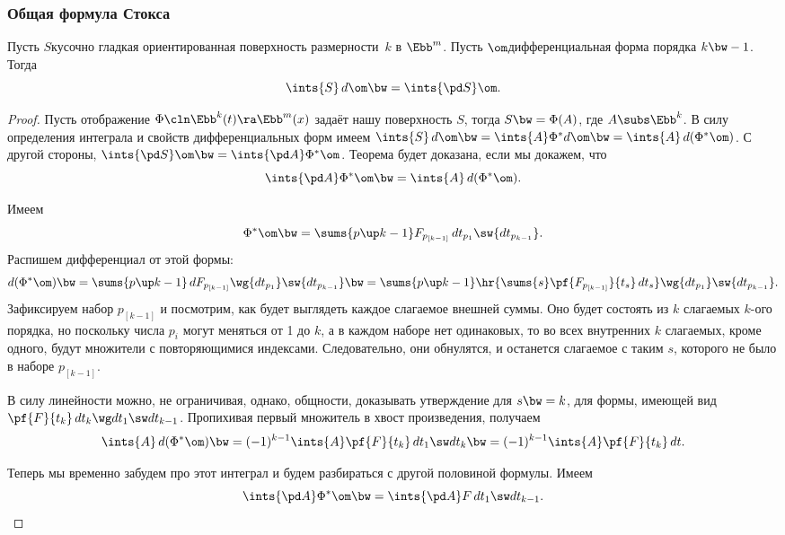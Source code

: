 \documentclass[a4paper]{article}
\newcommand{\pv}[1]{{p_{[#1]}}}
\newcommand{\di}[3]{{d {#1}_{#2_{#3}}}}
\begin{document}
\subsubsection{Общая формула Стокса}

\begin{theorem}
Пусть $S$\т кусочно гладкая ориентированная поверхность размерности~$k$ в $\Ebb^m$. Пусть $\om$\т дифференциальная форма
порядка $k\bw-1$. Тогда
$$\ints{S}\,d \om \bw= \ints{\pd S} \om.$$
\end{theorem}
\begin{proof}
Пусть отображение $\Phi\cln \Ebb^k(t) \ra \Ebb^m(x)$ задаёт нашу поверхность $S$, тогда $S \bw= \Phi(A)$, где
$A \subs \Ebb^k$. В силу определения интеграла и свойств дифференциальных форм имеем $\ints{S}\,d \om \bw=
\ints{A}\Phi^*d \om \bw= \ints{A}\,d(\Phi^*\om)$. С другой стороны, $\ints{\pd S}\om \bw= \ints{\pd A}
\Phi^*\om$. Теорема будет доказана, если мы докажем, что
$$\ints{\pd A} \Phi^*\om \bw= \ints{A}\,d(\Phi^*\om).$$

Имеем
$$\Phi^*\om \bw= \sums{p\up k-1} F_{\pv{k-1}} \,\di tp1\sw \di tp{k-1}.$$
Распишем дифференциал от этой формы:
$$
d(\Phi^*\om) \bw= \sums{p\up k-1} \,d F_{\pv{k-1}} \wg \di tp1\sw \di tp{k-1}\bw= \sums{p\up k-1}
\hr{\sums{s}\pf{F_{\pv{k-1}}}{t_s}\,d t_s} \wg \di tp1\sw \di tp{k-1}.
$$
Зафиксируем набор $\pv{k-1}$ и посмотрим, как будет выглядеть каждое слагаемое внешней суммы.
Оно будет состоять из $k$ слагаемых $k$-ого порядка, но поскольку числа $p_i$ могут меняться от 1 до $k$,
а в каждом наборе нет одинаковых, то во всех внутренних $k$ слагаемых, кроме одного, будут множители с
повторяющимися индексами. Следовательно, они обнулятся,
и останется слагаемое с таким $s$, которого не было в наборе $\pv{k-1}$.

В силу линейности можно, не ограничивая, однако, общности, доказывать утверждение для $s \bw= k$,  для
формы, имеющей вид $\pf{F}{t_k}\,d t_k \wg dt_1 \sw dt_{k-1}$. Пропихивая первый множитель в хвост
произведения, получаем
$$
  \ints{A}\,d(\Phi^*\om) \bw= (-1)^{k-1}\ints{A}\pf{F}{t_k} \,d t_1 \sw d t_k \bw=
  (-1)^{k-1}\ints{A} \pf{F}{t_k} \,d t.
$$

Теперь мы временно забудем про этот интеграл и будем разбираться с другой половиной формулы. Имеем
$$\ints{\pd A}\Phi^*\om \bw= \ints{\pd A}F\,d t_1\sw d t_{k-1}.$$


\end{proof}
\end{document}
